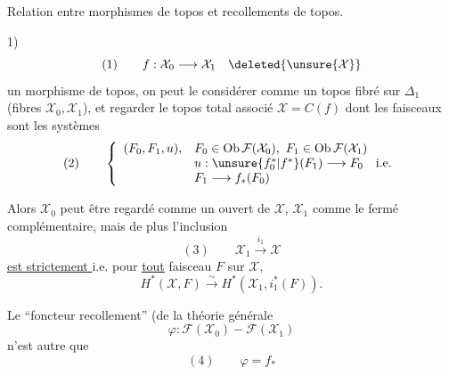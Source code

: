 Relation entre morphismes de topos et recollements de topos.


1) 
\[
(1)\qquad f:\mathcal X_0\longrightarrow\mathcal X_1\quad\deleted{\unsure{\mathcal X}}
\]
un morphisme de topos, on peut le considérer comme un topos fibré sur $\Delta_1$ (fibres $\mathcal X_0,\mathcal X_1$), et regarder le topos total associé $\mathcal X=C(f)$  dont les faisceaux sont les systèmes
\[
(2)\qquad\left\{\begin{array}{ll}
(F_0,F_1,u),&F_0\in\operatorname{Ob}\mathcal F(\mathcal X_0),\ F_1\in\operatorname{Ob}\mathcal F(\mathcal X_1)\\
&u:\unsure{f_0^*|f^*}(F_1)\longrightarrow F_0\quad\text{i.e.}\\
&F_1\longrightarrow f_*(F_0)
\end{array}\right.
\]

Alors $\mathcal X_0$ peut être regardé comme un ouvert de $\mathcal X$, $\mathcal X_1$ comme le fermé complémentaire, mais de plus l'inclusion
\[
(3)\qquad\mathcal X_1\xrightarrow{i_1}\mathcal X
\]
\uline{est strictement }
i.e. pour \uline{tout} faisceau $F$  sur $\mathcal X$,
\[
H^*(\mathcal X,F)\xrightarrow{\sim}H^*(\mathcal X_1,i_1^*(F)).
\]

 Le ``foncteur recollement''  (de la théorie générale
\[
\varphi:\mathcal F(\mathcal X_0)\mathbin{-}\mathcal F(\mathcal X_1)
\]
n'est autre que
\[
(4)\qquad\varphi=f_*
\]
